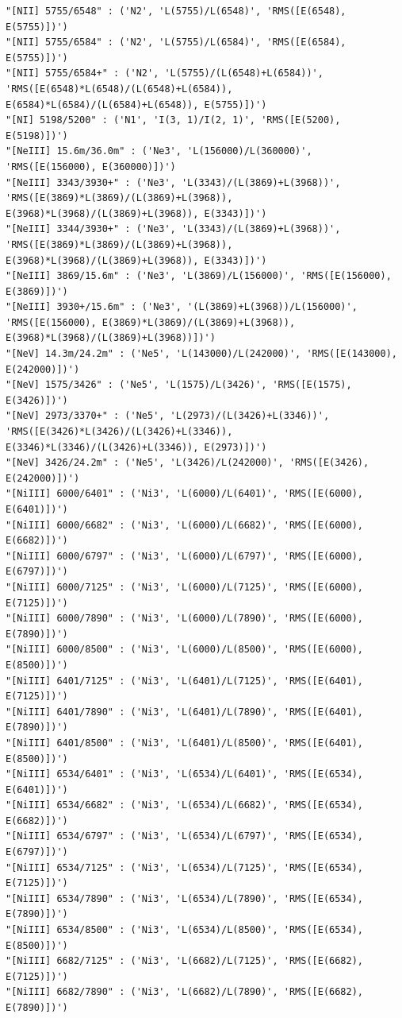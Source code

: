 \documentclass{report}
\begin{document}
\begin{Verbatim}[commandchars=\\\{\}]
"[NII] 5755/6548" : ('N2', 'L(5755)/L(6548)', 'RMS([E(6548), E(5755)])')
"[NII] 5755/6584" : ('N2', 'L(5755)/L(6584)', 'RMS([E(6584), E(5755)])')
"[NII] 5755/6584+" : ('N2', 'L(5755)/(L(6548)+L(6584))', 'RMS([E(6548)*L(6548)/(L(6548)+L(6584)), E(6584)*L(6584)/(L(6584)+L(6548)), E(5755)])')
"[NI] 5198/5200" : ('N1', 'I(3, 1)/I(2, 1)', 'RMS([E(5200), E(5198)])')
"[NeIII] 15.6m/36.0m" : ('Ne3', 'L(156000)/L(360000)', 'RMS([E(156000), E(360000)])')
"[NeIII] 3343/3930+" : ('Ne3', 'L(3343)/(L(3869)+L(3968))', 'RMS([E(3869)*L(3869)/(L(3869)+L(3968)), E(3968)*L(3968)/(L(3869)+L(3968)), E(3343)])')
"[NeIII] 3344/3930+" : ('Ne3', 'L(3343)/(L(3869)+L(3968))', 'RMS([E(3869)*L(3869)/(L(3869)+L(3968)), E(3968)*L(3968)/(L(3869)+L(3968)), E(3343)])')
"[NeIII] 3869/15.6m" : ('Ne3', 'L(3869)/L(156000)', 'RMS([E(156000), E(3869)])')
"[NeIII] 3930+/15.6m" : ('Ne3', '(L(3869)+L(3968))/L(156000)', 'RMS([E(156000), E(3869)*L(3869)/(L(3869)+L(3968)), E(3968)*L(3968)/(L(3869)+L(3968))])')
"[NeV] 14.3m/24.2m" : ('Ne5', 'L(143000)/L(242000)', 'RMS([E(143000), E(242000)])')
"[NeV] 1575/3426" : ('Ne5', 'L(1575)/L(3426)', 'RMS([E(1575), E(3426)])')
"[NeV] 2973/3370+" : ('Ne5', 'L(2973)/(L(3426)+L(3346))', 'RMS([E(3426)*L(3426)/(L(3426)+L(3346)), E(3346)*L(3346)/(L(3426)+L(3346)), E(2973)])')
"[NeV] 3426/24.2m" : ('Ne5', 'L(3426)/L(242000)', 'RMS([E(3426), E(242000)])')
"[NiIII] 6000/6401" : ('Ni3', 'L(6000)/L(6401)', 'RMS([E(6000), E(6401)])')
"[NiIII] 6000/6682" : ('Ni3', 'L(6000)/L(6682)', 'RMS([E(6000), E(6682)])')
"[NiIII] 6000/6797" : ('Ni3', 'L(6000)/L(6797)', 'RMS([E(6000), E(6797)])')
"[NiIII] 6000/7125" : ('Ni3', 'L(6000)/L(7125)', 'RMS([E(6000), E(7125)])')
"[NiIII] 6000/7890" : ('Ni3', 'L(6000)/L(7890)', 'RMS([E(6000), E(7890)])')
"[NiIII] 6000/8500" : ('Ni3', 'L(6000)/L(8500)', 'RMS([E(6000), E(8500)])')
"[NiIII] 6401/7125" : ('Ni3', 'L(6401)/L(7125)', 'RMS([E(6401), E(7125)])')
"[NiIII] 6401/7890" : ('Ni3', 'L(6401)/L(7890)', 'RMS([E(6401), E(7890)])')
"[NiIII] 6401/8500" : ('Ni3', 'L(6401)/L(8500)', 'RMS([E(6401), E(8500)])')
"[NiIII] 6534/6401" : ('Ni3', 'L(6534)/L(6401)', 'RMS([E(6534), E(6401)])')
"[NiIII] 6534/6682" : ('Ni3', 'L(6534)/L(6682)', 'RMS([E(6534), E(6682)])')
"[NiIII] 6534/6797" : ('Ni3', 'L(6534)/L(6797)', 'RMS([E(6534), E(6797)])')
"[NiIII] 6534/7125" : ('Ni3', 'L(6534)/L(7125)', 'RMS([E(6534), E(7125)])')
"[NiIII] 6534/7890" : ('Ni3', 'L(6534)/L(7890)', 'RMS([E(6534), E(7890)])')
"[NiIII] 6534/8500" : ('Ni3', 'L(6534)/L(8500)', 'RMS([E(6534), E(8500)])')
"[NiIII] 6682/7125" : ('Ni3', 'L(6682)/L(7125)', 'RMS([E(6682), E(7125)])')
"[NiIII] 6682/7890" : ('Ni3', 'L(6682)/L(7890)', 'RMS([E(6682), E(7890)])')

\end{Verbatim}
\end{document}
